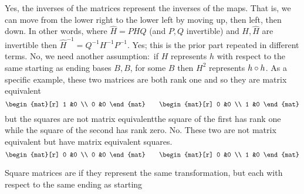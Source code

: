 \begin{exercises}
\begin{answer}
\begin{exparts}
\begin{equation*}
           \end{equation*}
           Yes, the inverses of the matrices represent the 
           inverses of the maps.
           That is, we can move from the lower right to the lower left by
           moving up, then left, then down.
           In other words, where \( \hat{H}=PHQ \) (and  \( P,Q \) invertible)
           and \( H,\hat{H} \) are invertible then
           \( \hat{H}^{-1}=Q^{-1}H^{-1}P^{-1} \).
        \partsitem Yes; this is the prior part repeated in different terms.
        \partsitem No, we need another assumption:~if \( H \) represents 
          \( h \) with respect to the same starting as ending bases \( B,B \), 
          for some \( B \) then \( H^2 \) represents
          \( h\mathbin\circ h \).
          As a specific example, 
          these two matrices are both rank one and so they are
          matrix equivalent
          \begin{equation*}
             \begin{mat}[r]
               1  &0  \\
               0  &0
             \end{mat}
             \qquad
             \begin{mat}[r]
               0  &0  \\
               1  &0
             \end{mat}
          \end{equation*}
          but the squares are not matrix equivalent\Dash the square of the 
          first has rank one while the square of the second has rank zero.
        \partsitem No.
          These two are not matrix equivalent but have matrix equivalent
          squares.
          \begin{equation*}
             \begin{mat}[r]
               0  &0  \\
               0  &0
             \end{mat}
             \qquad
             \begin{mat}[r]
               0  &0  \\
               1  &0
             \end{mat} 
          \end{equation*}
      \end{exparts}  
    \end{answer}
  \recommended \item
    Square matrices are  if they represent the same
    transformation, but each with respect to the same ending as starting

\end{exercises}
